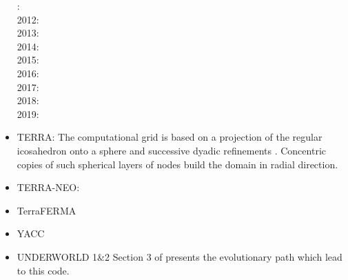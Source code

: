 \begin{itemize}
: \cite{qube11}\cite{ellw11}\\
2012: \cite{buit12}\cite{tebu12}\cite{crsg12}\cite{grel12}\\
2013: \cite{ghbu13}\\
2014: \cite{ghbu14}\cite{qubu14}\\
2015: \cite{nabu15}\\
2016: \cite{zwsn16}\\
2017: \cite{nabp17}\\
2018: \cite{tebu18}\\
2019: \cite{elgb19}

\item TERRA: 
The computational grid is based on a projection of the regular icosahedron onto a 
sphere and successive dyadic refinements \cite{bafr85}.  Concentric copies of such  
spherical layers of nodes build the domain in radial direction.

\cite{baum83}
\cite{glat88}
\cite{tasg93}
\cite{tasg94}
\cite{buba95}
\cite{burb97}\cite{yang97}
\cite{burl98}
\cite{phbs09}\cite{wodd09}\cite{gows09}
\cite{yayh10}
\cite{woda11}
\cite{dagd12}
\cite{dadb13}
\cite{vade16}

\item TERRA-NEO:

\cite{wegg15}


\item TerraFERMA

\noindent
\cite{wisv14}
\cite{wisv17}
\cite{spmw16}
\cite{ceww17}
\cite{ceww19}


\item YACC

\noindent
\cite{sato12}
\cite{toyd13}
\cite{tosn15}
\cite{tomy16}

\item UNDERWORLD 1\&2 
Section 3 of \cite{qums07} presents the evolutionary path which lead to this code.


\end{itemize}
